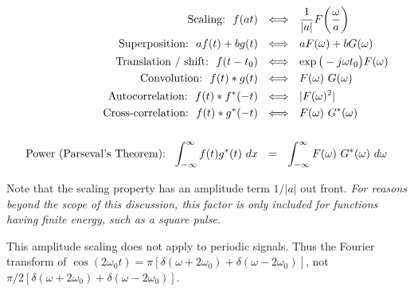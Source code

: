 \documentclass[11pt,letterpaper,draft]{exam}
\begin{document}
\begin{equation*}
\begin{split}
\text{Scaling:}~~f(at)~~&\Longleftrightarrow~~\frac{1}{|a|}F\bigg{(}\frac{\omega}{a}\bigg{)}\\
\text{Superposition:}~~af(t)+bg(t)~~&\Longleftrightarrow~~aF(\omega)+bG(\omega)\\
\text{Translation~/~shift:}~~f(t-t_0)~~&\Longleftrightarrow~~\exp\big{(}-j\omega
t_0\big{)}F(\omega)\\
\text{Convolution:}~~f(t)\ast
g(t)~~&\Longleftrightarrow~~F(\omega)~G(\omega)\\
\text{Autocorrelation:}~~f(t)\ast
f^\ast(-t)~~&\Longleftrightarrow~~|F(\omega)^2|\\
\text{Cross-correlation:}~~f(t)\ast
g^\ast(-t)~~&\Longleftrightarrow~~F(\omega)~G^{\ast}(\omega)\\
\\
\text{Power (Parseval's Theorem):}~~\int^{\infty}_{-\infty}f(t)g^{\ast}(t)~dx~~&=~~
\int^{\infty}_{-\infty}F(\omega)~G^{\ast}(\omega)~d\omega
\end{split}
\end{equation*}

Note that the scaling property has an amplitude term $1/|a|$ out
front.  \textit{For reasons beyond the scope of this discussion, this
factor is only included for functions having finite energy, such as a
square pulse.}

This amplitude scaling  does not apply to periodic signals.  Thus the
Fourier transform of $\cos(2\omega_0 t) = \pi[\delta(\omega +
2\omega_0) + \delta(\omega - 2\omega_0)]$, not $\pi/2[\delta(\omega +
2\omega_0) + \delta(\omega - 2\omega_0)]$.
\end{document}
